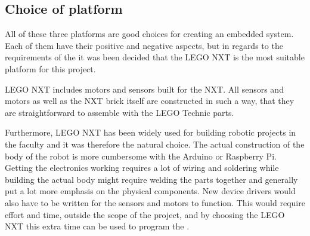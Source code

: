 \subsection{Choice of platform}
All of these three platforms are good choices for creating an embedded system. Each of them have their positive and negative aspects, but in regards to the requirements of the \projname{} it was been decided that the LEGO NXT is the most suitable platform for this project.

LEGO NXT includes motors and sensors built for the NXT. All sensors and motors as well as the NXT brick itself are constructed in such a way, that they are straightforward to assemble with the LEGO Technic parts. 

Furthermore, LEGO NXT has been widely used for building robotic projects in the faculty and it was therefore the natural choice. The actual construction of the body of the robot is more cumbersome with the Arduino or Raspberry Pi. Getting the electronics working requires a lot of wiring and soldering while building the actual body might require welding the parts together and generally put a lot more emphasis on the physical components. New device drivers would also have to be written for the sensors and motors to function. This would require effort and time, outside the scope of the project, and by choosing the LEGO NXT this extra time can be used to program the \projname{}.



